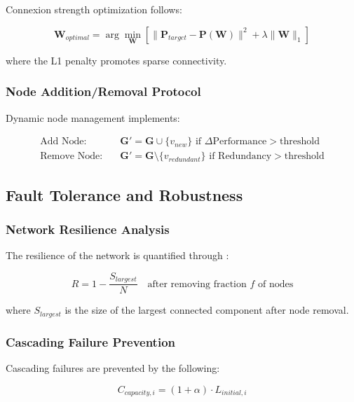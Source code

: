 \documentclass[12pt,a4paper]{article}
\begin{document}
Connexion strength optimization follows:

\begin{equation}
\mathbf{W}_{optimal} = \arg\min_{\mathbf{W}} \left[ \|\mathbf{P}_{target} - \mathbf{P}(\mathbf{W})\|^2 + \lambda \|\mathbf{W}\|_1 \right]
\end{equation}

where the L1 penalty promotes sparse connectivity.

\subsubsection{Node Addition/Removal Protocol}

Dynamic node management implements:

\begin{align}
\text{Add Node}: &\quad \mathbf{G}' = \mathbf{G} \cup \{v_{new}\} \text{ if } \Delta \text{Performance} > \text{threshold} \\
\text{Remove Node}: &\quad \mathbf{G}' = \mathbf{G} \setminus \{v_{redundant}\} \text{ if } \text{Redundancy} > \text{threshold}
\end{align}

\subsection{Fault Tolerance and Robustness}

\subsubsection{Network Resilience Analysis}

The resilience of the network is quantified through \cite{albert2000error}:

\begin{equation}
R = 1 - \frac{S_{largest}}{N} \quad \text{after removing fraction } f \text{ of nodes}
\end{equation}

where $S_{largest}$ is the size of the largest connected component after node removal.

\subsubsection{Cascading Failure Prevention}

Cascading failures are prevented by the following:

\begin{equation}
C_{capacity,i} = (1 + \alpha) \cdot L_{initial,i}
\end{equation}
\end{document}
